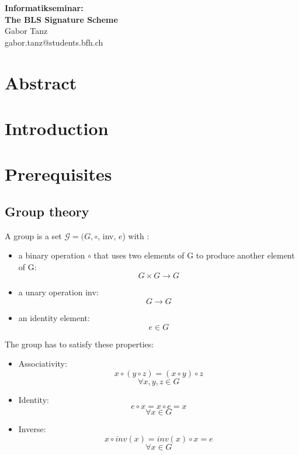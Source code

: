 \documentclass[a4paper,12pt]{scrartcl}
\begin{document}
\begin{titlepage}
\begin{center}
\vspace*{3cm}
\vspace{1cm}
\Huge \textbf{Informatikseminar: \\ The BLS Signature Scheme} \\
\vspace{6cm}
\vspace{1cm}
\large Gabor Tanz \\ gabor.tanz@students.bfh.ch \\
\end{center}
\end{titlepage}

\tableofcontents
\pagebreak

\section{Abstract}
\pagebreak

\section{Introduction}
\pagebreak

\section{Prerequisites}
\subsection{Group theory}
A group is a set \(\mathcal{G} = (G, \circ\), inv, \(e\)) with \cite[Slide 2.16]{crypto-slides-haenni} :
\begin{itemize}
	\item a binary operation \(\circ \) that uses two elements of G to produce another element of G:
	\[ G \times G \rightarrow G \]
	\item a unary operation inv:
	\[ G \rightarrow G \]
	\item an identity element:
	\[ e \in G \]
\end{itemize}
The group has to satisfy these properties:
\begin{itemize}
	\item Associativity:
	\[ x \circ (y \circ z) = (x \circ y) \circ z \]
	\[\forall x,y,z \in G \]
	\item Identity:
	\[ e \circ x = x \circ e = x \]
	\[ \forall x \in G \]
	\item Inverse:
	\[ x \circ inv(x) = inv(x) \circ x = e \]
	\[ \forall x \in G \]
\end{itemize}
\end{document}
